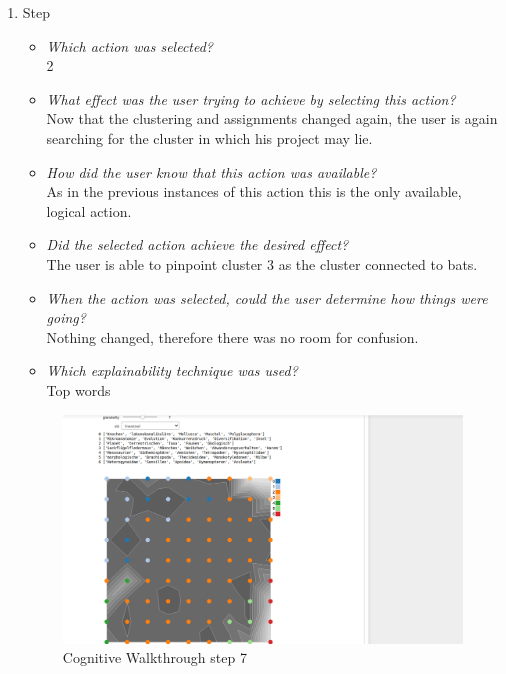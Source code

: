 {\begin{enumerate}
		\item Step
		\begin{itemize}
			\item \textit{Which action was selected?} \\
			2
			\item \textit{What effect was the user trying to achieve by selecting this action?} \\
			Now that the clustering and assignments changed again, the user is again searching for the cluster in which his project may lie. 
			\item \textit{How did the user know that this action was available?} \\
			As in the previous instances of this action this is the only available, logical action. 
			\item \textit{Did the selected action achieve the desired effect?} \\
			The user is able to pinpoint cluster 3 as the cluster connected to bats. 
			\item \textit{When the action was selected, could the user determine how things were going?} \\
			Nothing changed, therefore there was no room for confusion.
			\item \textit{Which explainability technique was used?}\\
			Top words
		\end{itemize}
		\begin{figure}[H]
			\centering
			\includegraphics[width=400px]{../chapters/validation/pics/5_c}
			\caption{\label{pic:step7} Cognitive Walkthrough step 7}
		\end{figure} \newpage
		

\end{enumerate}}
